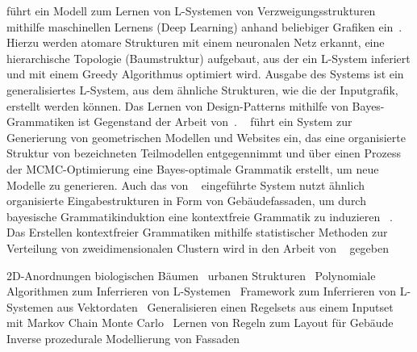 \citeauthor{guo_2020} führt ein Modell zum Lernen von L-Systemen von Verzweigungsstrukturen mithilfe maschinellen
Lernens (Deep Learning) anhand beliebiger Grafiken ein~\cite{guo_2020}.
Hierzu werden atomare Strukturen mit einem neuronalen Netz erkannt, eine hierarchische Topologie (Baumstruktur)
aufgebaut, aus der ein L-System inferiert und mit einem Greedy Algorithmus optimiert wird.
Ausgabe des Systems ist ein generalisiertes L-System, aus dem ähnliche Strukturen, wie die der Inputgrafik,
erstellt werden können.
Das Lernen von Design-Patterns mithilfe von Bayes-Grammatiken ist Gegenstand der Arbeit von~\citeauthor{talton_2012}.
~\cite{talton_2012} führt ein System zur Generierung von geometrischen Modellen und Websites ein, das eine organisierte
Struktur von bezeichneten Teilmodellen entgegennimmt und über einen Prozess der MCMC-Optimierung eine Bayes-optimale
Grammatik erstellt, um neue Modelle zu generieren.
Auch das von ~\citeauthor{martinovic_2013} eingeführte System nutzt ähnlich organisierte Eingabestrukturen in Form von
Gebäudefassaden, um durch bayesische Grammatikinduktion eine kontextfreie Grammatik zu induzieren ~\cite{martinovic_2013}.
Das Erstellen kontextfreier Grammatiken mithilfe statistischer Methoden zur Verteilung von zweidimensionalen Clustern
wird in den Arbeit von ~\citeauthor{stava_2010} gegeben

2D-Anordnungen
biologischen Bäumen~\cite{stava_2014}
urbanen Strukturen~\cite{nishida_2016}
Polynomiale Algorithmen zum Inferrieren von L-Systemen~\cite{mcquillan_2018}
Framework zum Inferrieren von L-Systemen aus Vektordaten~\cite{stava_2010}
Generalisieren einen Regelsets aus einem Inputset mit Markov Chain Monte Carlo~\cite{talton_2012, talton_2011}
Lernen von Regeln zum Layout für Gebäude~\cite{martinovic_2013}
Inverse prozedurale Modellierung von Fassaden~\cite{xiao_2008}